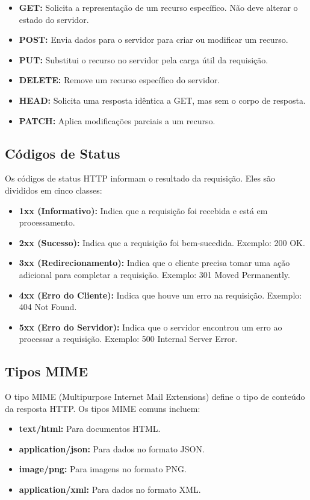 \begin{itemize}
    \item \textbf{GET:} Solicita a representação de um recurso específico. Não deve alterar o estado do servidor.
    \item \textbf{POST:} Envia dados para o servidor para criar ou modificar um recurso.
    \item \textbf{PUT:} Substitui o recurso no servidor pela carga útil da requisição.
    \item \textbf{DELETE:} Remove um recurso específico do servidor.
    \item \textbf{HEAD:} Solicita uma resposta idêntica a GET, mas sem o corpo de resposta.
    \item \textbf{PATCH:} Aplica modificações parciais a um recurso.
\end{itemize}

\subsection{Códigos de Status}
Os códigos de status HTTP informam o resultado da requisição. Eles são divididos em cinco classes:

\begin{itemize}
    \item \textbf{1xx (Informativo):} Indica que a requisição foi recebida e está em processamento.
    \item \textbf{2xx (Sucesso):} Indica que a requisição foi bem-sucedida. Exemplo: 200 OK.
    \item \textbf{3xx (Redirecionamento):} Indica que o cliente precisa tomar uma ação adicional para completar a requisição. Exemplo: 301 Moved Permanently.
    \item \textbf{4xx (Erro do Cliente):} Indica que houve um erro na requisição. Exemplo: 404 Not Found.
    \item \textbf{5xx (Erro do Servidor):} Indica que o servidor encontrou um erro ao processar a requisição. Exemplo: 500 Internal Server Error.
\end{itemize}

\subsection{Tipos MIME}
O tipo MIME (Multipurpose Internet Mail Extensions) define o tipo de conteúdo da resposta HTTP. Os tipos MIME comuns incluem:

\begin{itemize}
    \item \textbf{text/html:} Para documentos HTML.
    \item \textbf{application/json:} Para dados no formato JSON.
    \item \textbf{image/png:} Para imagens no formato PNG.
    \item \textbf{application/xml:} Para dados no formato XML.
\end{itemize}

